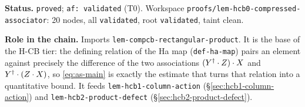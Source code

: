 \medskip
\noindent\textbf{Status.} \texttt{proved}; \texttt{af: validated} (T0). Workspace
\texttt{proofs/lem-hcb0-compressed-associator}: 20 nodes, all \texttt{validated}, root
\texttt{validated}, taint clean.

\noindent\textbf{Role in the chain.} Imports
\texttt{lem-compcb-rectangular-product}. It is the base of the H-CB tier: the defining
relation of the Ha map (\texttt{def-ha-map}) pairs an element against precisely the
difference of the two associations $(Y^{\dagger}\mathbin{\cdot} Z)\mathbin{\cdot} X$ and $Y^{\dagger}\mathbin{\cdot}(Z\mathbin{\cdot} X)$, so
\eqref{eq:as-main} is exactly the estimate that turns that relation into a quantitative
bound. It feeds \texttt{lem-hcb1-column-action} (\S\ref{sec:hcb1-column-action}) and
\texttt{lem-hcb2-product-defect} (\S\ref{sec:hcb2-product-defect}).
